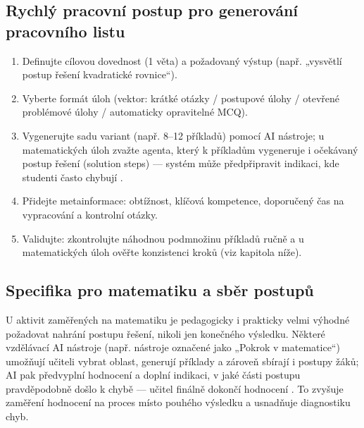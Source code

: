\documentclass{report}%
\begin{document}
\subsection*{Rychlý pracovní postup pro generování pracovního listu}
\begin{enumerate}
  \item Definujte cílovou dovednost (1 věta) a požadovaný výstup (např. „vysvětlí postup řešení kvadratické rovnice“).
  \item Vyberte formát úloh (vektor: krátké otázky / postupové úlohy / otevřené problémové úlohy / automaticky opravitelné MCQ).
  \item Vygenerujte sadu variant (např. 8–12 příkladů) pomocí AI nástroje; u matematických úloh zvažte agenta, který k příkladům vygeneruje i očekávaný postup řešení (solution steps) — systém může předpřipravit indikaci, kde studenti často chybují \cite{kb_ai_101_tipu_pdf_04e4a115_page_8_1}.
  \item Přidejte metainformace: obtížnost, klíčová kompetence, doporučený čas na vypracování a kontrolní otázky.
  \item Validujte: zkontrolujte náhodnou podmnožinu příkladů ručně a u matematických úloh ověřte konzistenci kroků (viz kapitola níže).
\end{enumerate}

\subsection*{Specifika pro matematiku a sběr postupů}
U aktivit zaměřených na matematiku je pedagogicky i prakticky velmi výhodné požadovat nahrání postupu řešení, nikoli jen konečného výsledku. Některé vzdělávací AI nástroje (např. nástroje označené jako „Pokrok v matematice“) umožňují učiteli vybrat oblast, generují příklady a zároveň sbírají i postupy žáků; AI pak předvyplní hodnocení a doplní indikaci, v jaké části postupu pravděpodobně došlo k chybě — učitel finálně dokončí hodnocení \cite{kb_ai_101_tipu_pdf_04e4a115_page_8_1}. To zvyšuje zaměření hodnocení na proces místo pouhého výsledku a usnadňuje diagnostiku chyb.
\end{document}
